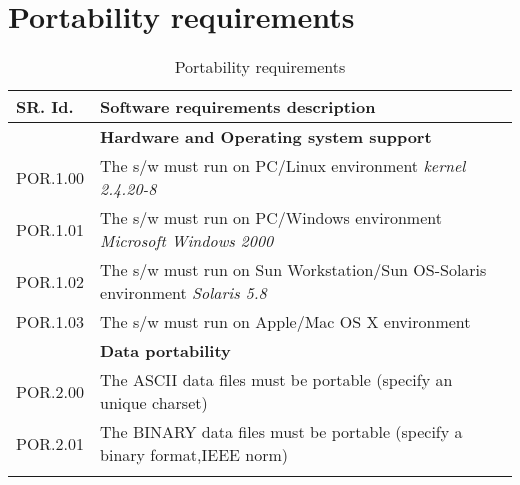 \section{Portability requirements}
\begin{longtable}{%
|>{\columncolor[gray]{.8}}p{}%
|>{\columncolor[gray]{.95}}p{}|}
   \hline
\rowcolor[gray]{.8}   SR. Id. & Software requirements description \\
      \hline 
   & \textbf{  Hardware and Operating system support }\\
   \hline
   POR.1.00 & The s/w must run on PC/Linux environment \textit{kernel 2.4.20-8}\\
   POR.1.01 & The s/w must run on PC/Windows environment \textit{Microsoft Windows 2000}\\
   POR.1.02 & The s/w must run on Sun Workstation/Sun OS-Solaris environment \textit{Solaris 5.8}\\
   POR.1.03 & The s/w must run on  Apple/Mac OS X environment \\
   \hline 
   & \textbf{ Data portability}\\
   \hline
   POR.2.00 & The ASCII data files must be portable (specify an unique charset)\\ 
   POR.2.01 & The BINARY data files must be portable (specify a binary format,IEEE norm)\\ 
   \hline
\caption{Portability requirements}\\
\end{longtable}



